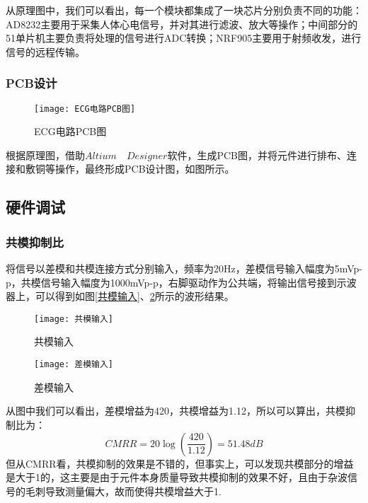 \documentclass{zjureport}
\begin{document}
	从原理图中，我们可以看出，每一个模块都集成了一块芯片分别负责不同的功能：AD8232主要用于采集人体心电信号，并对其进行滤波、放大等操作；中间部分的51单片机主要负责将处理的信号进行ADC转换；NRF905主要用于射频收发，进行信号的远程传输。
	
	\subsubsection{PCB设计}
	
	\begin{figure}[H]
		\centering%
		\texttt{[image: ECG电路PCB图]}
		\caption{ECG电路PCB图}%
		\label{ECG电路PCB图}%
	\end{figure}
	
	根据原理图，借助$Altium \quad Designer$软件，生成PCB图，并将元件进行排布、连接和敷铜等操作，最终形成PCB设计图，如图所示。
	
	\subsection{硬件调试}
	
	\subsubsection{共模抑制比}

将信号以差模和共模连接方式分别输入，频率为20Hz，差模信号输入幅度为5mVp-p，共模信号输入幅度为1000mVp-p，右脚驱动作为公共端，将输出信号接到示波器上，可以得到如图\ref{共模输入}、\ref{差模输入}所示的波形结果。

\begin{figure}[H]
	\centering
	\begin{minipage}[t]{0.49\linewidth}%
		\texttt{[image: 共模输入]}%
		\caption{共模输入}
		\label{共模输入}
	\end{minipage}%
	\begin{minipage}[t]{0.49\linewidth}
		\texttt{[image: 差模输入]}
		\caption{差模输入}
		\label{差模输入}
	\end{minipage}
\end{figure}

从图中我们可以看出，差模增益为420，共模增益为1.12，所以可以算出，共模抑制比为：
\begin{equation}
	CMRR=20\log(\frac{420}{1.12})=51.48dB
\end{equation}
但从CMRR看，共模抑制的效果是不错的，但事实上，可以发现共模部分的增益是大于1的，这主要是由于元件本身质量导致共模抑制的效果不好，且由于杂波信号的毛刺导致测量偏大，故而使得共模增益大于1.
\end{document}
